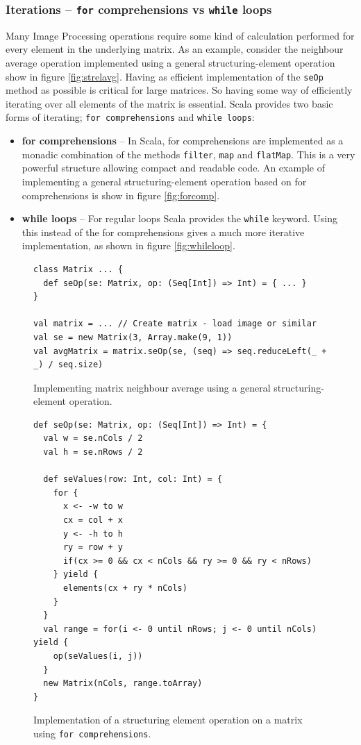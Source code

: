\documentclass[a4paper,english]{report}
\begin{document}
\subsubsection{Iterations -- \texttt{for} comprehensions vs \texttt{while} loops}

Many Image Processing operations require some kind of calculation
performed for every element in the underlying matrix. As an example,
consider the neighbour average operation implemented using a general
structuring-element operation show in figure
\vref{fig:strelavg}. Having as efficient implementation of the
\texttt{seOp} method as possible is critical for large matrices. So
having some way of efficiently iterating over all elements of the
matrix is essential. Scala provides two basic forms of iterating;
\texttt{for comprehensions} and \texttt{while loops}:

\begin{itemize}
\item \textbf{for comprehensions} -- In Scala, for comprehensions are
  implemented as a monadic combination of the methods \texttt{filter},
  \texttt{map} and \texttt{flatMap}. This is a very powerful structure
  allowing compact and readable code. An example of implementing a
  general structuring-element operation based on for comprehensions is
  show in figure \vref{fig:forcomp}.
\item \textbf{while loops} -- For regular loops Scala provides the
  \texttt{while} keyword. Using this instead of the for comprehensions
  gives a much more iterative implementation, as shown in figure
  \vref{fig:whileloop}.
\end{itemize}

\begin{figure}
  \begin{lstlisting}
class Matrix ... {
  def seOp(se: Matrix, op: (Seq[Int]) => Int) = { ... }
}

val matrix = ... // Create matrix - load image or similar
val se = new Matrix(3, Array.make(9, 1))
val avgMatrix = matrix.seOp(se, (seq) => seq.reduceLeft(_ + _) / seq.size)
  \end{lstlisting}
  \caption{Implementing matrix neighbour average using a general
    structuring-element operation.\label{fig:strelavg}}
\end{figure}

\begin{figure}
  \begin{lstlisting}
def seOp(se: Matrix, op: (Seq[Int]) => Int) = {
  val w = se.nCols / 2
  val h = se.nRows / 2

  def seValues(row: Int, col: Int) = {
    for {
      x <- -w to w
      cx = col + x
      y <- -h to h
      ry = row + y
      if(cx >= 0 && cx < nCols && ry >= 0 && ry < nRows)
    } yield {
      elements(cx + ry * nCols)
    }
  }
  val range = for(i <- 0 until nRows; j <- 0 until nCols) yield {
    op(seValues(i, j))
  }
  new Matrix(nCols, range.toArray)
}
  \end{lstlisting}
  \caption{Implementation of a structuring element operation on a
    matrix using \texttt{for comprehensions}.\label{fig:forcomp}}
\end{figure}
\end{document}

